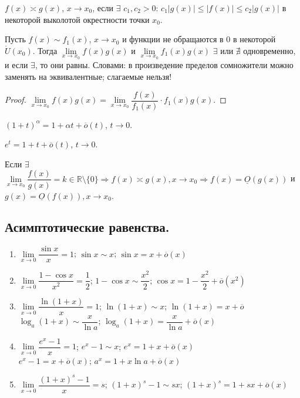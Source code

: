 \documentclass[12pt]{article}
\begin{document}
	\begin{definition}
		$f(x) \asymp g(x)$, $x \rightarrow x_0$, если $\exists$ $c_1, c_2 > 0$: $c_1|g(x)| \leqslant |f(x)| \leqslant c_2|g(x)|$ в некоторой выколотой окрестности точки $x_0$.
	\end{definition}
	\begin{theorem}
		Пусть $f(x) \sim f_1(x)$, $x \rightarrow x_0$ и функции не обращаются в $0$ в некоторой $\mathring{U}(x_0)$. Тогда $\lim\limits_{x \rightarrow x_0} f(x)g(x)$ и $\lim\limits_{x \rightarrow x_0} f_1(x)g(x)$ $\exists$ или $\nexists$ одновременно, и если $\exists$, то они равны. Словами: в произведение пределов сомножители можно заменять на эквивалентные; слагаемые нельзя!
	\end{theorem}
	\begin{proof}
		$\lim\limits_{x \rightarrow x_0} f(x)g(x) = \lim\limits_{x \rightarrow x_0} \dfrac{f(x)}{f_1(x)} \cdot f_1(x)g(x)$.
	\end{proof}
	\begin{statement}
		$(1 + t)^\alpha = 1 + \alpha t + \overline{o}(t)$, $t \rightarrow 0$.
	\end{statement}
	\begin{statement}
		$e^t = 1 + t + \overline{o}(t)$, $t \rightarrow 0$.
	\end{statement}
	\begin{statement}
		Если $\exists$ $\lim\limits_{x \rightarrow x_0} \dfrac{f(x)}{g(x)} = k \in \mathbb{R} \setminus \{ 0 \} \Rightarrow f(x) \asymp g(x), x \rightarrow x_0 \Rightarrow f(x) = \underline{O}(g(x))$ и $g(x) = \underline{O}(f(x)), x \rightarrow x_0$.
	\end{statement}
	\subsection{Асимптотические равенства.}
	\begin{enumerate}
		\item $\lim\limits_{x \rightarrow 0} \dfrac{\sin x}{x} = 1$; $\sin x \sim x$; $\sin x = x + \overline{o}(x)$
		\item $\lim\limits_{x \rightarrow 0} \dfrac{1 - \cos x}{x^2} = \dfrac{1}{2}$; $1 - \cos x \sim \dfrac{x^2}{2}$; $\cos x = 1 - \dfrac{x^2}{2} + \overline{o}(x^2)$
		\item $\lim\limits_{x \rightarrow 0} \dfrac{\ln (1 + x)}{x} = 1$; $\ln (1 + x) \sim x$; $\ln (1 + x) = x + \overline{o}$ \\
		$\log_a(1 + x) \sim \dfrac{x}{\ln a}$; $\log_a(1 + x) = \dfrac{x}{\ln a} + \overline{o}(x)$
		\item $\lim\limits_{x \rightarrow 0} \dfrac{e^x - 1}{x} = 1$; $e^x - 1 \sim x$; $e^x = 1 + x + \overline{o}(x)$ \\
		$e^x - 1 = x + \overline{o}(x)$; $a^x = 1 + x \ln a + \overline{o}(x)$
		\item $\lim\limits_{x \rightarrow 0} \dfrac{(1 + x)^s - 1}{x} = s$; $(1 + x)^s - 1 \sim sx$; $(1 + x)^s = 1 + sx + \overline{o}(x)$
	\end{enumerate}
\end{document}
